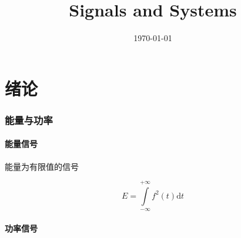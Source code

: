 \documentclass{article}
\title{Signals and Systems}
\author{}
\date{\today}
\begin{document}
\hypersetup{
    hidelinks,
    allcolors = black,
    breaklinks = true
}

\newtheorem{definition}{Definition}[subsection]
\newtheorem{theorem}{Theorem}[subsection]
\newtheorem{corollary}{Corollary}[theorem]
\renewcommand{\proofname}{\indent\bf Proof}

\def\e{\mathrm e}
\def\i{\mathrm i}
\def\j{\mathrm j}
\def\d{\mathrm d}
\def\C{\mathrm C}
\def\div{\mathrm{div}}
\def\rot{\mathrm{rot}}
\def\vecv{\vec{\mathrm v}}
\def\sr{\mathbb R}
\def\sn{\mathbb N}
\def\snp{\mathbb N^+}
\def\sc{\mathbb C}
\def\sz{\mathbb Z}
\edef\impint{\int\limits_{-\infty}^{+\infty}}
\def\sumsz{\sum_{n\in\sz}}

\newcommand{\abs}[1]{\left|#1\right|}
\newcommand{\pare}[1]{\left(#1\right)}
\newcommand{\fourier}[1]{\mathscr F\pare{#1}}
\newcommand{\ifourier}[1]{\mathscr F^{-1}\pare{#1}}
\newcommand{\laplace}[1]{\mathscr L\pare{#1}}
\newcommand{\ilaplace}[1]{\mathscr L^{-1}\pare{#1}}
\newcommand{\jacobi}[2]{\frac{\partial\pare{#1}}{\partial\pare{#2}}}

\def\ft{f\pare{t}}


\begin{titlepage}
    \maketitle
\end{titlepage}

\tableofcontents
\newpage

\part{绪论}

\section{能量与功率}

\subsection{能量信号}

能量为有限值的信号

\[E=\impint f^2\pare{t}\d t\]

\subsection{功率信号}
\end{document}

